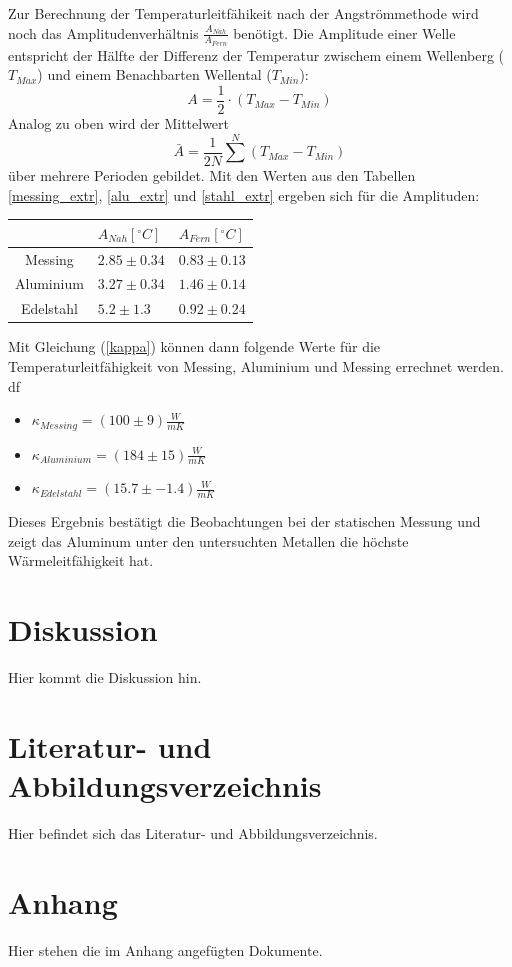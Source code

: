 \documentclass[11pt]{article}
\begin{document}
Zur Berechnung der Temperaturleitfähikeit nach der Angströmmethode wird noch das Amplitudenverhältnis $\frac{A_{Nah}}{A_{Fern}}$ benötigt. Die Amplitude einer Welle entspricht der Hälfte der Differenz der Temperatur zwischem einem Wellenberg ($T_{Max}$) und einem Benachbarten Wellental ($T_{Min}$):
\begin{equation}
A = \frac12\cdot(T_{Max}-T_{Min})
\end{equation}
Analog zu oben wird der Mittelwert
\begin{equation}
\bar {A} = \frac1{2N} \sum^N (T_{Max}-T_{Min})
\end{equation}
über mehrere Perioden gebildet. Mit den Werten aus den Tabellen \ref{messing_extr}, \ref{alu_extr} und \ref{stahl_extr} ergeben sich für die Amplituden:
\begin{table}[H]
\centering
\begin{tabular}{c|l|l}
	& $A_{Nah}[^\circ C]$ & $A_{Fern}[^\circ C]$\\
	\hline
	Messing&$2.85\pm0.34 $& $0.83\pm0.13$ \\
	Aluminium & $3.27\pm0.34$ & $1.46\pm0.14$\\
	Edelstahl & $ 5.2\pm1.3 $ &   $0.92\pm0.24 $\\
\end{tabular}
\end{table}\noindent
\begin{table}[H]

\end{table}\noindent
Mit Gleichung (\ref{kappa}) können dann folgende Werte für die Temperaturleitfähigkeit von Messing, Aluminium und Messing errechnet werden. df
\begin{itemize}
\item $\kappa_{Messing} = (100\pm9)\frac{W}{m K}$
\item $\kappa_{Aluminium} = (184\pm15)\frac{W}{m K}$
\item $\kappa_{Edelstahl} = (15.7\pm-1.4)\frac{W}{m K}$
\end{itemize}
Dieses Ergebnis bestätigt die Beobachtungen bei der statischen Messung und zeigt das Aluminum unter den untersuchten Metallen die höchste Wärmeleitfähigkeit hat.

\section{Diskussion}
Hier kommt die Diskussion hin.
\section{Literatur- und Abbildungsverzeichnis}
Hier befindet sich das Literatur- und Abbildungsverzeichnis.
\section{Anhang}
Hier stehen die im Anhang angefügten Dokumente.
\end{document}
